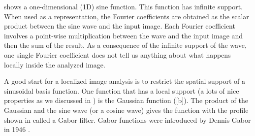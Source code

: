 


 shows a one-dimensional (1D) sine function. This function has infinite support. When used as a representation, the Fourier coefficients are obtained as the scalar product between the sine wave and the input image. Each Fourier coefficient involves a point-wise multiplication between the wave and the input image and then the sum of the result. As a consequence of the infinite support of the wave, one single Fourier coefficient does not tell us anything about what happens locally inside the analyzed image.

A good start for a localized image analysis is to restrict the spatial support of a sinusoidal basis function. One function that has a local support (a lots of nice properties as we discussed in \chap{\ref{chap:blur_filters}}) is the Gaussian function (\fig{\ref{fig:1D_gabor_function}}[b]). The product of the Gaussian and the sine wave (or a cosine wave) gives the function with the profile shown in  called a Gabor filter. Gabor functions were introduced by Dennis Gabor in 1946 \cite{Gabor1946TheoryOC}.


